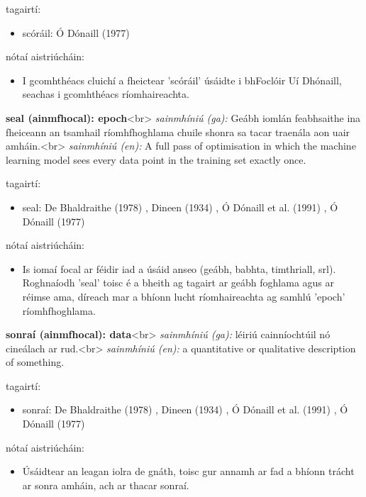 \documentclass{article}
\begin{document}
tagairtí:
\begin{itemize}
	\item scóráil: Ó Dónaill (1977) \cite{odonaill}
\end{itemize}

nótaí aistriúcháin:
\begin{itemize}
	\item I gcomhthéacs cluichí a fheictear 'scóráil' úsáidte i bhFoclóir Uí Dhónaill, seachas i gcomhthéacs ríomhaireachta.
\end{itemize}


\textbf{seal (ainmfhocal): epoch}<br>
\textit{sainmhíniú (ga):}  Geábh iomlán feabhsaithe ina fheiceann an tsamhail ríomhfhoghlama chuile shonra sa tacar traenála aon uair amháin.<br>
\textit{sainmhíniú (en):} A full pass of optimisation in which the machine learning model sees every data point in the training set exactly once.

tagairtí:
\begin{itemize}
	\item seal: De Bhaldraithe (1978) \cite{de-bhaldraithe}, Dineen (1934) \cite{dineen}, Ó Dónaill et al. (1991) \cite{focloir-beag}, Ó Dónaill (1977) \cite{odonaill}
\end{itemize}

nótaí aistriúcháin:
\begin{itemize}
	\item Is iomaí focal ar féidir iad a úsáid anseo (geábh, babhta, timthriall, srl). Roghnaíodh 'seal' toisc é a bheith ag tagairt ar geábh foghlama agus ar réimse ama, díreach mar a bhíonn lucht ríomhaireachta ag samhlú 'epoch' ríomhfhoghlama.
\end{itemize}


\textbf{sonraí (ainmfhocal): data}<br>
\textit{sainmhíniú (ga):} léiriú cainníochtúil nó cineálach ar rud.<br>
\textit{sainmhíniú (en):} a quantitative or qualitative description of something.

tagairtí:
\begin{itemize}
	\item sonraí: De Bhaldraithe (1978) \cite{de-bhaldraithe}, Dineen (1934) \cite{dineen}, Ó Dónaill et al. (1991) \cite{focloir-beag}, Ó Dónaill (1977) \cite{odonaill}
\end{itemize}

nótaí aistriúcháin:
\begin{itemize}
	\item Úsáidtear an leagan iolra de gnáth, toisc gur annamh ar fad a bhíonn trácht ar sonra amháin, ach ar thacar sonraí.
\end{itemize}
\end{document}
